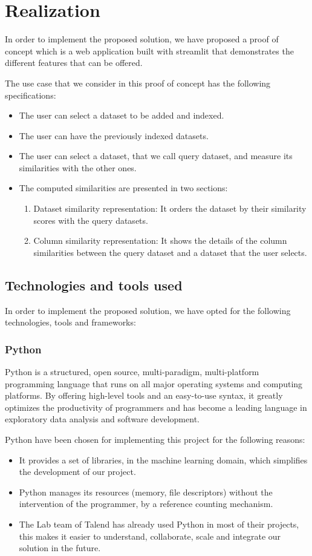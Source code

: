 \chapter{Realization}
In order to implement the proposed solution, we have proposed a proof of concept
which is a web application built with streamlit that demonstrates the different
features that can be offered.

The use case that we consider in this proof of concept has the following specifications:
\begin{itemize}
    \item The user can select a dataset to be added and indexed.
    \item The user can have the previously indexed datasets.
    \item The user can select a dataset, that we call query dataset, and measure
    its similarities with the other ones.
    \item The computed similarities are presented in two sections:
    \begin{enumerate}
        \item Dataset similarity representation: It orders the dataset by their
        similarity scores with the query datasets.
        \item Column similarity representation: It shows the details of the
        column similarities between the query dataset and a dataset that the
        user selects.
    \end{enumerate}
\end{itemize}


\section{Technologies and tools used}
In order to implement the proposed solution, we have opted for the following
technologies, tools and frameworks:
\subsection{Python}
Python is a structured, open source, multi-paradigm, multi-platform programming
language that runs on all major operating systems and computing platforms. By
offering high-level tools and an easy-to-use syntax, it greatly optimizes the
productivity of programmers and has become a leading language in exploratory
data analysis and software development.

Python have been chosen for implementing this project for the following reasons:
\begin{itemize}
    \item It provides a set of libraries, in the machine learning domain, which
    simplifies the development of our project.
    \item Python manages its resources (memory, file descriptors) without the
    intervention of the programmer, by a reference counting mechanism.
    \item The Lab team of Talend has already used Python in most of their
    projects, this makes it easier to understand, collaborate, scale and
    integrate our solution in the future.
\end{itemize}

